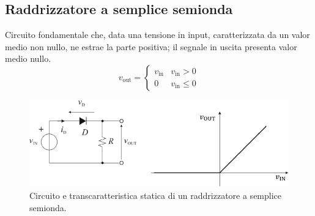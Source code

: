 \documentclass[a4paper]{article}
\begin{document}
{{		\subsection{Raddrizzatore a semplice semionda}
			Circuito fondamentale che, data una tensione in input, caratterizzata da un valor medio non nullo, ne estrae la parte positiva; il segnale in uscita presenta valor medio nullo.
			\begin{equation*}
				v_{\mathrm{out}} =
				\begin{cases}
					v_{\mathrm{in}} & v_{\mathrm{in}} > 0 \\
					0 				& v_{\mathrm{in}} \le 0
				\end{cases}
			\end{equation*}
			\begin{figure}[h!]
				\centering
				\includegraphics[scale=0.7]{transcaratteristicaStaticaRaddrizzatoreASempliceSemionda}
				\caption{Circuito e transcaratteristica statica di un raddrizzatore a semplice semionda.}
				\label{fig:transcaratteristicaStaticaRaddrizzatoreASempliceSemionda}
			\end{figure}
}}
\end{document}
